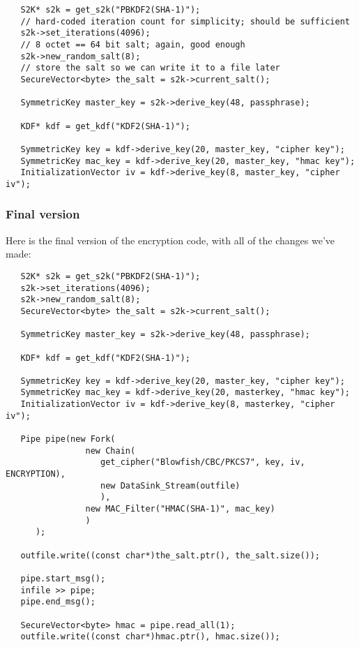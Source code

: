\documentclass{article}
\begin{document}
\begin{verbatim}
   S2K* s2k = get_s2k("PBKDF2(SHA-1)");
   // hard-coded iteration count for simplicity; should be sufficient
   s2k->set_iterations(4096);
   // 8 octet == 64 bit salt; again, good enough
   s2k->new_random_salt(8);
   // store the salt so we can write it to a file later
   SecureVector<byte> the_salt = s2k->current_salt();

   SymmetricKey master_key = s2k->derive_key(48, passphrase);

   KDF* kdf = get_kdf("KDF2(SHA-1)");

   SymmetricKey key = kdf->derive_key(20, master_key, "cipher key");
   SymmetricKey mac_key = kdf->derive_key(20, master_key, "hmac key");
   InitializationVector iv = kdf->derive_key(8, master_key, "cipher iv");
\end{verbatim}

\subsubsection{Final version}

Here is the final version of the encryption code, with all of the changes we've
made:

\begin{verbatim}
   S2K* s2k = get_s2k("PBKDF2(SHA-1)");
   s2k->set_iterations(4096);
   s2k->new_random_salt(8);
   SecureVector<byte> the_salt = s2k->current_salt();

   SymmetricKey master_key = s2k->derive_key(48, passphrase);

   KDF* kdf = get_kdf("KDF2(SHA-1)");

   SymmetricKey key = kdf->derive_key(20, master_key, "cipher key");
   SymmetricKey mac_key = kdf->derive_key(20, masterkey, "hmac key");
   InitializationVector iv = kdf->derive_key(8, masterkey, "cipher iv");

   Pipe pipe(new Fork(
                new Chain(
                   get_cipher("Blowfish/CBC/PKCS7", key, iv, ENCRYPTION),
                   new DataSink_Stream(outfile)
                   ),
                new MAC_Filter("HMAC(SHA-1)", mac_key)
                )
      );

   outfile.write((const char*)the_salt.ptr(), the_salt.size());

   pipe.start_msg();
   infile >> pipe;
   pipe.end_msg();

   SecureVector<byte> hmac = pipe.read_all(1);
   outfile.write((const char*)hmac.ptr(), hmac.size());
\end{verbatim}
\end{document}

